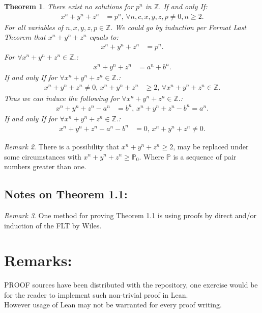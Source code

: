 \documentclass[10pt]{article}
\theoremstyle{plain}
\newtheorem{theorem}{Theorem}[section]
\theoremstyle{definition}
\theoremstyle{remark}
\newtheorem{remark}[theorem]{Remark}
\begin{document}
	\begin{theorem}
		There exist no solutions for $p^{n}$ in $\mathbb{Z}.$ If and only If:
		\begin{align*}
			x^{n} + y^{n} + z^{n} &= p^{n}, \, \forall n, c, x, y, z, p \neq 0, n \geq 2.
		\end{align*}
		For all variables of $n, x, y, z, p \in \mathbb{Z}.$ We could go by induction per Fermat Last Theorem that $x^{n} + y^{n} + z^{n}$ equals to:	
		\begin{align*}
			x^{n} + y^{n} + z^{n} &= p^{n}.
		\end{align*}
		For $\forall x^{n} + y^{n} + z^{n} \in \mathbb{Z}.$:
		\begin{align*}
			x^{n} + y^{n} + z^{n} &= a^{n} + b^{n}.
		\end{align*}
		If and only If for $\forall x^{n} + y^{n} + z^{n} \in \mathbb{Z}.$:
		\begin{align*}
			x^{n} + y^{n} + z^{n} \neq 0, \, x^{n} + y^{n} + z^{n} &\geq 2, \, \forall x^{n} + y^{n} + z^{n} \in \mathbb{Z}.
		\end{align*}
		Thus we can induce the following for $\forall x^{n} + y^{n} + z^{n} \in \mathbb{Z}.$:
		\begin{align*}
			x^{n} + y^{n} + z^{n} -  a^{n} &= b^{n}, \, x^{n} + y^{n} + z^{n} - b^{n} = a^{n}.
		\end{align*}
		If and only If for $\forall x^{n} + y^{n} + z^{n} \in \mathbb{Z}.$:
		\begin{align*}
			x^{n} + y^{n} + z^{n} -  a^{n} - b^{n} &= 0, \, x^{n} + y^{n} + z^{n} \neq 0.
		\end{align*}
	\end{theorem}
	\begin{remark}
		There is a possibility that $x^{n} + y^{n} + z^{n} \geq 2$, may be replaced under some circumstances with $x^{n} + y^{n} + z^{n} \geq \mathbb{P}_{0}.$ Where $\mathbb{P}$ is a sequence of pair numbers greater than one.
	\end{remark}
	\subsection{Notes on Theorem 1.1:}
	\begin{remark}
		One method for proving Theorem 1.1 is using proofs by direct and/or induction of the FLT by Wiles.
	\end{remark}
	\section{Remarks:}
	\lettrine[lines=1, lhang=0.1, loversize=0.2]{P}ROOF sources have been distributed with the repository, one exercise would be for the reader to implement such non-trivial proof in Lean.\\However usage of Lean may not be warranted for every proof writing.
\end{document}
